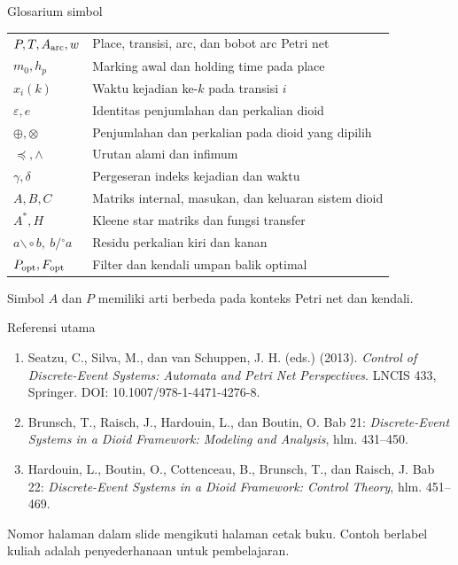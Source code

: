 \documentclass[aspectratio=169,11pt]{beamer}
\newcommand{\eps}{\varepsilon}
\newcommand{\res}{\mathbin{\backslash\!\circ}}
\begin{document}
\begin{frame}{Glosarium simbol}

\small
\begin{center}\begin{tabular}{ll}\toprule
$P,T,A_{\rm arc},w$&Place, transisi, arc, dan bobot arc Petri net\\
$m_0,h_p$&Marking awal dan holding time pada place\\
$x_i(k)$&Waktu kejadian ke-$k$ pada transisi $i$\\
$\eps,e$&Identitas penjumlahan dan perkalian dioid\\
$\oplus,\otimes$&Penjumlahan dan perkalian pada dioid yang dipilih\\
$\preceq,\wedge$&Urutan alami dan infimum\\
$\gamma,\delta$&Pergeseran indeks kejadian dan waktu\\
$A,B,C$&Matriks internal, masukan, dan keluaran sistem dioid\\
$A^*,H$&Kleene star matriks dan fungsi transfer\\
$a\res b,\ b/\!^\circ a$&Residu perkalian kiri dan kanan\\
$P_{\rm opt},F_{\rm opt}$&Filter dan kendali umpan balik optimal\\\bottomrule
\end{tabular}\end{center}
Simbol $A$ dan $P$ memiliki arti berbeda pada konteks Petri net dan kendali.

\end{frame}
\begin{frame}{Referensi utama}


\small
\begin{enumerate}
\item Seatzu, C., Silva, M., dan van Schuppen, J. H. (eds.) (2013).
\textit{Control of Discrete-Event Systems: Automata and Petri Net Perspectives}.
LNCIS 433, Springer. DOI: 10.1007/978-1-4471-4276-8.
\item Brunsch, T., Raisch, J., Hardouin, L., dan Boutin, O.
Bab 21: \textit{Discrete-Event Systems in a Dioid Framework: Modeling and Analysis},
hlm. 431--450.
\item Hardouin, L., Boutin, O., Cottenceau, B., Brunsch, T., dan Raisch, J.
Bab 22: \textit{Discrete-Event Systems in a Dioid Framework: Control Theory},
hlm. 451--469.
\end{enumerate}
Nomor halaman dalam slide mengikuti halaman cetak buku.
Contoh berlabel kuliah adalah penyederhanaan untuk pembelajaran.


\end{frame}
\end{document}
